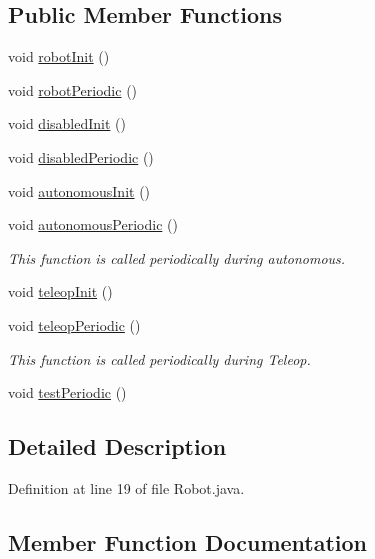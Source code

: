 \subsection*{Public Member Functions}
\begin{DoxyCompactItemize}
\item 
void \hyperlink{classfrc_1_1robot_1_1_robot_a1d28582cf3dc31568c3581f631c92f13}{robot\+Init} ()
\item 
void \hyperlink{classfrc_1_1robot_1_1_robot_a7e63e32ebe8ad3d33bbc3b09092a9f1f}{robot\+Periodic} ()
\item 
void \hyperlink{classfrc_1_1robot_1_1_robot_ac19810fbf26efd4cd47cbd7568b4ad2a}{disabled\+Init} ()
\item 
void \hyperlink{classfrc_1_1robot_1_1_robot_a2bc1b0ce100e4783ba3d549e6ac07ae3}{disabled\+Periodic} ()
\item 
void \hyperlink{classfrc_1_1robot_1_1_robot_a5b1c022cd3e2b9f6e5dde62571839173}{autonomous\+Init} ()
\item 
void \hyperlink{classfrc_1_1robot_1_1_robot_a7dcfe7d0d65d1051eb095b8eb1aebd72}{autonomous\+Periodic} ()
\begin{DoxyCompactList}\small\item\em This function is called periodically during autonomous. \end{DoxyCompactList}\item 
void \hyperlink{classfrc_1_1robot_1_1_robot_a209dbf07bfec75d73fa53126a8e31b88}{teleop\+Init} ()
\item 
void \hyperlink{classfrc_1_1robot_1_1_robot_ae807171661cbc29081bc10f06d6831e7}{teleop\+Periodic} ()
\begin{DoxyCompactList}\small\item\em This function is called periodically during Teleop. \end{DoxyCompactList}\item 
void \hyperlink{classfrc_1_1robot_1_1_robot_abd152f34b9f33d5cdf835aa61331f33e}{test\+Periodic} ()
\end{DoxyCompactItemize}


\subsection{Detailed Description}


Definition at line 19 of file Robot.\+java.



\subsection{Member Function Documentation}
\mbox{\label{classfrc_1_1robot_1_1_robot_a5b1c022cd3e2b9f6e5dde62571839173}} 
